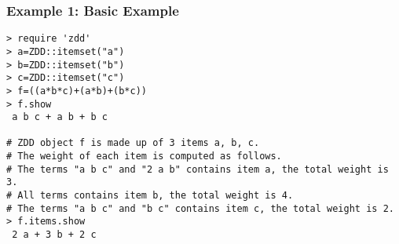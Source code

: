 \subsubsection*{Example 1: Basic Example}



\begin{Verbatim}[baselinestretch=0.7,frame=single]
> require 'zdd'
> a=ZDD::itemset("a")
> b=ZDD::itemset("b")
> c=ZDD::itemset("c")
> f=((a*b*c)+(a*b)+(b*c))
> f.show
 a b c + a b + b c

# ZDD object f is made up of 3 items a, b, c. 
# The weight of each item is computed as follows. 
# The terms "a b c" and "2 a b" contains item a, the total weight is 3. 
# All terms contains item b, the total weight is 4.
# The terms "a b c" and "b c" contains item c, the total weight is 2. 
> f.items.show
 2 a + 3 b + 2 c
\end{Verbatim}
